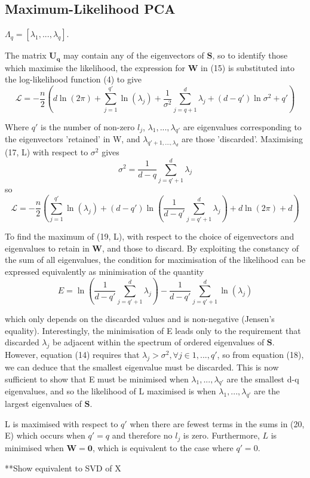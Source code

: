 \documentclass[ %
                    author={Dillon Keith Diep},
                supervisor={Dr. Carl Henrik Ek},
                    degree={MEng},
                     title={Assisted Content Generation for 3D Hair Geometry},
                  subtitle={[INCOMPLETE DRAFT, NOT FOR SUBMISSION]},
                      type={Research},
                      year={2014} ]{dissertation}
\begin{document}
\subsection{Maximum-Likelihood PCA}
{ \color{red}
 $\Lambda_q=[ \lambda_1,...,\lambda_q ]$.

The matrix $\mathbf{U_q}$ may contain any of the eigenvectors of $\mathbf{S}$, so to identify those which maximise the likelihood, the expression for $\mathbf{W}$ in (15) is substituted into the log-likelihood function (4) to give 
$$\mathcal{L}=-\frac{n}{2} ( d\ln(2\pi)+\sum^{q'}_{j=1}\ln(\lambda_j)+\frac{1}{\sigma^2}\sum^d_{j=q+1}\lambda_j+(d-q')\ln\sigma^2+q' )$$

Where $q'$ is the number of non-zero $l_j$, $\lambda_1,...,\lambda_{q'}$ are eigenvalues corresponding to the eigenvectors 'retained' in W, and $\lambda_{q'+1,...,\lambda_d}$ are those 'discarded'. Maximising (17, L) with respect to $\sigma^2$ gives
$$\sigma^2=\frac{1}{d-q}\sum^d_{j=q'+1}\lambda_j$$
so
$$\mathcal{L}=-\frac{n}{2}( \sum^{q'}_{j=1}\ln(\lambda_j)+(d-q')\ln( \frac{1}{d-q'}\sum^d_{j=q'+1}\lambda_j ) +d\ln(2\pi)+d )$$

To find the maximum of (19, L), with respect to the choice of eigenvectors and eigenvalues to retain in $\mathbf{W}$, and those to discard.
By exploiting the constancy of the sum of all eigenvalues, the condition for maximisation of the likelihood can be expressed equivalently as minimisation of the quantity
$$E=\ln(\frac{1}{d-q'}\sum^d_{j=q'+1}\lambda_j)-\frac{1}{d-q'}\sum^d_{j=q'+1}\ln(\lambda_j)$$

which only depends on the discarded values and is non-negative (Jensen's equality). Interestingly, the minimisation of E leads only to the requirement that discarded $\lambda_j$ be adjacent within the spectrum of ordered eigenvalues of $\mathbf{S}$. However, equation (14) requires that $\lambda_j > \sigma^2, \forall j \in {1,...,q'}$, so from equation (18), we can deduce that the smallest eigenvalue must be discarded. This is now sufficient to show that E must be minimised when $\lambda_1,...,\lambda_{q'}$ are the smallest d-q eigenvalues, and so the likelihood of L maximised is when $\lambda_1,...,\lambda_{q'}$ are the largest eigenvalues of $\mathbf{S}$.

L is maximised with respect to $q'$ when there are fewest terms in the sums in (20, E) which occurs when $q'=q$ and therefore no $l_j$ is zero. Furthermore, $L$ is minimised when $\mathbf{W=0}$, which is equivalent to the case where $q'=0$.

**Show equivalent to SVD of X
}
\end{document}
